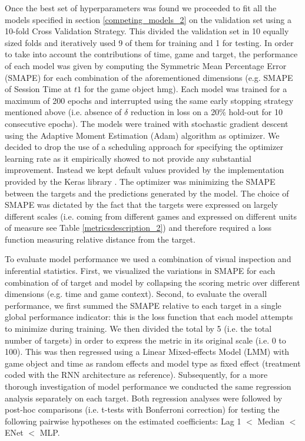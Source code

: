 Once the best set of hyperparameters was found we proceeded to fit all the models specified in section \ref{competing_models_2} on the validation set using a 10-fold Cross Validation Strategy. This  divided the validation set in 10 equally sized folds and iteratively used 9 of them for training and 1 for testing. In order to take into account the contributions of time, game and target, the performance of each model was given by computing the Symmetric Mean Percentage Error (SMAPE) \cite{zhu2017deep} for each combination of the aforementioned dimensions (e.g. SMAPE of Session Time at $t1$ for the game object hmg). Each model was trained for a maximum of 200 epochs and interrupted using the same early stopping strategy mentioned above (i.e. absence of $\delta$ reduction in loss on a 20\% hold-out for 10 consecutive epochs). The models were trained with stochastic gradient descent using the Adaptive Moment Estimation (Adam) \cite{kingma2014adam} algorithm as optimizer. We decided to drop the use of a scheduling approach for specifying the optimizer learning rate as it empirically showed to not provide any substantial improvement. Instead we kept default values provided by the implementation provided by the Keras library \cite{chollet2015keras}. The optimizer was minimizing the SMAPE between the targets and the predictions generated by the model. The choice of SMAPE was dictated by the fact that the targets were expressed on largely different scales (i.e. coming from different games and expressed on different units of measure see Table \ref{metricsdescription_2}) and therefore required a loss function measuring relative distance from the target. 

To evaluate model performance we used a combination of visual inspection and inferential statistics. First, we visualized the variations in SMAPE for each combination of of target and model by collapsing the scoring metric over different dimensions (e.g. time and game context). Second, to evaluate the overall performance, we first summed the SMAPE relative to each target in a single global performance indicator: this is the loss function that each model attempts to minimize during training. We then divided the total by 5 (i.e. the total number of targets) in order to express the metric in its original scale (i.e. 0 to 100). This was then regressed using a Linear Mixed-effects Model (LMM) with game object and time as random effects and model type as fixed effect (treatment coded with the RNN architecture as reference). Subsequently, for a more thorough investigation of model performance we conducted the same regression analysis separately on each target. Both regression analyses were followed by post-hoc comparisons (i.e. t-tests with Bonferroni correction) for testing the following pairwise hypotheses on the estimated coefficients: Lag 1 $<$ Median $<$ ENet $<$ MLP. 

